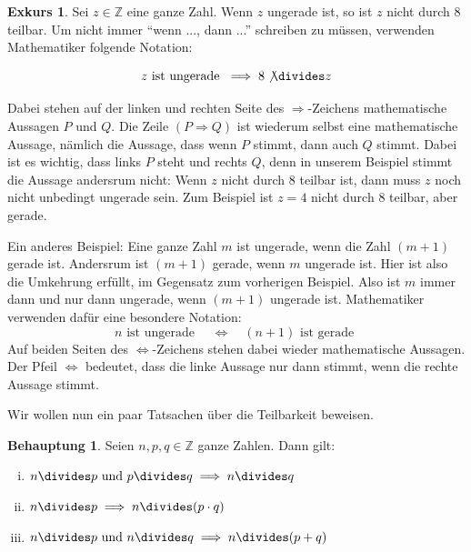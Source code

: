 \documentclass[a4paper,ngerman,12pt]{scrartcl}
\newcommand{\Z}{\mathbb{Z}}
\theoremstyle{definition}
\newtheorem{satz}{Behauptung}
\newtheorem*{exk}{Exkurs}
\newenvironment{exkurs}{\begin{shaded}\begin{exk}}{\end{exk}\end{shaded}}
\newenvironment{satzliste}{\begin{enumerate}[(i)]}{\end{enumerate}}
\begin{document}
\begin{exkurs}
  Sei $z \in \Z$ eine ganze Zahl. Wenn $z$ ungerade ist, so ist $z$ nicht durch $8$ teilbar. Um nicht immer "`wenn ..., dann ..."' schreiben zu müssen, verwenden Mathematiker folgende Notation:

  \[ z \text{ ist ungerade } \implies 8 \not\divides z \]

  Dabei stehen auf der linken und rechten Seite des $\Rightarrow$-Zeichens mathematische Aussagen $P$ und $Q$. Die Zeile $(P \Rightarrow Q)$ ist wiederum selbst eine mathematische Aussage, nämlich die Aussage, dass wenn $P$ stimmt, dann auch $Q$ stimmt. Dabei ist es wichtig, dass links $P$ steht und rechts $Q$, denn in unserem Beispiel stimmt die Aussage andersrum nicht: Wenn $z$ nicht durch $8$ teilbar ist, dann muss $z$ noch nicht unbedingt ungerade sein. Zum Beispiel ist $z = 4$ nicht durch $8$ teilbar, aber gerade.

  Ein anderes Beispiel: Eine ganze Zahl $m$ ist ungerade, wenn die Zahl $(m{+}1)$ gerade ist. Andersrum ist $(m{+}1)$ gerade, wenn $m$ ungerade ist. Hier ist also die Umkehrung erfüllt, im Gegensatz zum vorherigen Beispiel. Also ist $m$ immer dann und nur dann ungerade, wenn $(m{+}1)$ ungerade ist. Mathematiker verwenden dafür eine besondere Notation:
  \[ n \text{ ist ungerade } \quad \iff \quad (n + 1) \text{ ist gerade } \]
  Auf beiden Seiten des $\Leftrightarrow$-Zeichens stehen dabei wieder mathematische Aussagen. Der Pfeil $\Leftrightarrow$ bedeutet, dass die linke Aussage nur dann stimmt, wenn die rechte Aussage stimmt.
\end{exkurs}

Wir wollen nun ein paar Tatsachen über die Teilbarkeit beweisen.

\begin{satz}
  Seien $n, p, q \in \Z$ ganze Zahlen. Dann gilt:
  \begin{satzliste}
    \item $n \divides p \text{ und } p \divides q \implies n \divides q$
    \item $n \divides p \implies n \divides (p \cdot q)$
    \item $n \divides p \text{ und } n \divides q \implies n \divides (p + q)$
  \end{satzliste}
\end{satz}
\end{document}
